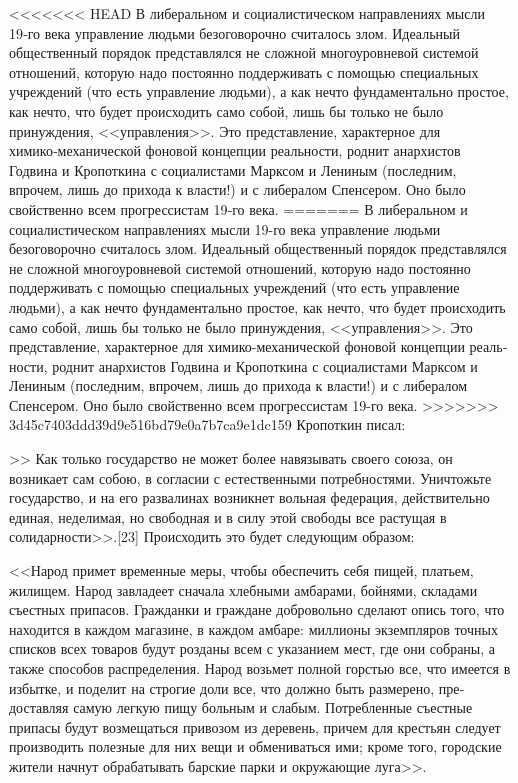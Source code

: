 \documentclass{book}
\begin{document}
<<<<<<< HEAD
В либеральном и социалистическом направлениях мысли 19‑го века управление людьми  безоговорочно считалось злом. Идеальный общественный порядок представлялся не сложной многоуровневой системой отношений, которую надо постоян­но поддерживать с помощью специальных учреждений (что есть управление людьми), а как нечто фундаментально простое, как нечто, что будет происходить само собой,  лишь бы только не было принуждения, <<управления>>. Это представление, харак­терное для химико‑механической фоновой концепции реаль­ности, роднит анархистов Годвина и Кропоткина с социалиста­ми Марксом и Лениным (последним, впрочем, лишь до при­хода к власти!) и с либералом Спенсером. Оно было свойственно всем прогрессистам 19‑го века.
=======
В либеральном и социалистическом направлениях мысли 19-го века управление людьми  безоговорочно считалось злом. Идеальный общественный порядок представлялся не сложной многоуровневой системой отношений, которую надо постоян­но поддерживать с помощью специальных учреждений (что есть управление людьми), а как нечто фундаментально простое, как нечто, что будет происходить само собой,  лишь бы только не было принуждения, <<управления>>. Это представление, харак­терное для химико-механической фоновой концепции реаль­ности, роднит анархистов Годвина и Кропоткина с социалиста­ми Марксом и Лениным (последним, впрочем, лишь до при­хода к власти!) и с либералом Спенсером. Оно было свойственно всем прогрессистам 19-го века.
>>>>>>> 3d45c7403ddd39d9e516bd79e0a7b7ca9e1dc159
Кропоткин писал:

>> Как только государство не может более навязывать свое­го союза, он возникает сам собою, в согласии с естественными потребностями. Уничтожьте государство, и на его развалинах возникнет вольная федерация, действительно единая, недели­мая, но свободная и в силу этой свободы все растущая в солидарности>>.[23]
Происходить это будет следующим образом:

<<Народ примет временные меры, чтобы обеспечить себя пи­щей, платьем, жилищем. Народ завладеет сначала хлебными ам­барами, бойнями, складами съестных припасов. Гражданки и граждане добровольно сделают опись того, что находится в каждом магазине, в каждом амбаре: миллионы экземпляров точных списков всех товаров будут розданы всем с указанием мест, где они собраны, а также способов распределения. На­род возьмет полной горстью все, что имеется в избытке, и по­делит на строгие доли все, что должно быть размерено, пре­доставляя самую легкую пищу больным и слабым. Потреблен­ные съестные припасы будут возмещаться привозом из дере­вень, причем для крестьян следует производить полезные для них вещи и обмениваться ими; кроме того, городские жители начнут обрабатывать барские парки и окружающие луга>>.
\end{document}
